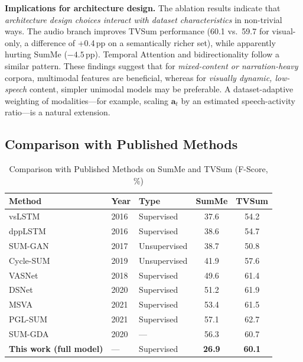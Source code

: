 \documentclass[10pt,conference]{IEEEtran}
\begin{document}
\textbf{Implications for architecture design.}
The ablation results indicate that \emph{architecture design choices
interact with dataset characteristics} in non-trivial ways. The audio
branch improves TVSum performance (60.1 vs.\ 59.7 for visual-only,
a difference of +0.4\,pp on a semantically richer set), while
apparently hurting SumMe ($-4.5$\,pp). Temporal Attention and
bidirectionality follow a similar pattern. These findings suggest that
for \emph{mixed-content or narration-heavy} corpora, multimodal
features are beneficial, whereas for \emph{visually dynamic, low-speech}
content, simpler unimodal models may be preferable. A dataset-adaptive
weighting of modalities---for example, scaling $\mathbf{a}_t$ by an
estimated speech-activity ratio---is a natural extension.

\subsection{Comparison with Published Methods}

\begin{table}[h]
\centering
\caption{Comparison with Published Methods on SumMe and TVSum (F-Score, \%)}
\label{tab:literature}
\begin{tabular}{lllcc}
\toprule
\textbf{Method} & \textbf{Year} & \textbf{Type} & \textbf{SumMe} & \textbf{TVSum} \\
\midrule
vsLSTM~\cite{zhang2016lstm}       & 2016 & Supervised   & 37.6 & 54.2 \\
dppLSTM~\cite{zhang2016lstm}      & 2016 & Supervised   & 38.6 & 54.7 \\
SUM-GAN~\cite{mahasseni2017}      & 2017 & Unsupervised & 38.7 & 50.8 \\
Cycle-SUM~\cite{zhang2019}        & 2019 & Unsupervised & 41.9 & 57.6 \\
VASNet~\cite{fajtl2018}           & 2018 & Supervised   & 49.6 & 61.4 \\
DSNet~\cite{zhu2021dsnet}         & 2020 & Supervised   & 51.2 & 61.9 \\
MSVA~\cite{ghauri2021}            & 2021 & Supervised   & 53.4 & 61.5 \\
PGL-SUM~\cite{apostolidis2021pgl} & 2021 & Supervised   & 57.1 & 62.7 \\
SUM-GDA                           & 2020 & ---          & 56.3 & 60.7 \\
\midrule
\textbf{This work (full model)}   & ---  & Supervised   & \textbf{26.9} & \textbf{60.1} \\
\bottomrule
\end{tabular}
\end{table}
\end{document}
